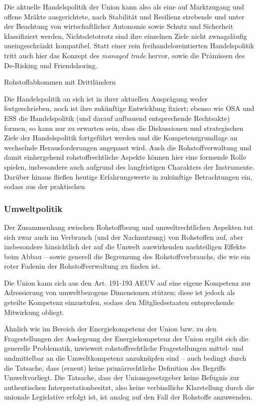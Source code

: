 \documentclass[12pt,a4paper,oneside]{book} %
\begin{document}
Die aktuelle Handelspolitik der Union kann also als eine auf Marktzugang und offene Mräkte ausgerichtete, nach Stabilität und Resilienz strebende und unter der Beachtung von wirtschaftlicher Autonomie sowie Schutz und Sicherheit klassifiziert werden,\autocite{RdTW 2024, 216} Nichtsdetotrotz sind ihre einzelnen Ziele nicht zwnagsläufig uneingeschränkt kompatibel.\autocite{RdTW 2024, 206} Statt einer rein freihandeloreintierten Handelspolitik tritt auch hier das Konzept des \textit{managed trade} hervor, sowie die Prämissen des De-Risking und Friendshoring.
	
	
Rohstoffabkommen mit Drittländern

Die Handelspolitik an sich ist in ihrer aktuellen Ausprägung weder festgeschrieben, noch ist ihre zukünftige Entwicklung fixiert; ebenso wie OSA und ESS die Handelspolitik (und darauf aufbauend entsprechende Rechtsakte) formen, so kann nur zu erwarten sein, dass die Diskussionen und strategischen Ziele der Handelspolitik fortgeführt werden und die Kompetenzgrundlage an wechselnde Herausforderungen angepasst wird. Auch die Rohstoffverwaltung und damit einhergehend rohstoffrechtliche Aspekte können hier eine formende Rolle spielen, insbesondere auch aufgrund des langfristigen Charakters der Instrumente. Darüber hinaus fließen heutige Erfahrungswerte in zukünftige Betrachtungen ein, sodass aus der praktischen 
	
	
\subsubsection{Umweltpolitik}
Der Zusammenhang zwischen Rohstoffbezug und umweltrechtlichen Aspekten tut sich zwar auch im Verbrauch (und der Nachnutzung) von Rohstoffen auf, aber insbesondere hinsichtlich der auf die Umwelt auswirkenden nachteiligen Effekte beim Abbau -- sowie generell die Begrenzung des Rohstoffverbrauchs, die \glqq wie ein roter Faden\grqq in der Rohstoffverwaltung zu finden ist\autocite{Schorkopf, Rohstoffverwaltung, Rn. 30}.

Die Union kann sich aus den Art. 191-193 AEUV auf eine eigene Kompetenz zur Adressierung von umweltbezogene Dimensionen stützen; diese ist jedoch als geteilte Kompetenz einzustufen, sodass den Mitgliedsstaaten entsprechende Mitwirkung obliegt.
	
Ähnlich wie im Bereich der Energiekompetenz der Union bzw. zu den Fragestellungen der Auslegeung der Energiekompetenz der Union ergibt sich die generelle Problematik, inwieweit rohstoffrechtliche Fragestellungen mittel- und undmittelbar an die Umweltkompetenz anzuknüpfen sind -- auch bedingt durch die Tatsache, dass (erneut) keine primärrechtliche Definition des Begriffs \glqq Umwelt\grqq vorliegt. Die Tatsache, dass der Unionsgesetzgeber \glqq keine Befugnis zur authentischen Interpretation\grqq besitzt,\autocite{Grabitz Hilf Nettesheim, Art. 191 Rn. 49} also keine verbindliche Klarstellung durch die unionale Legislative erfolgt ist,  ist analog auf den Fall der Rohstoffe anzuwenden.
	
\end{document}
